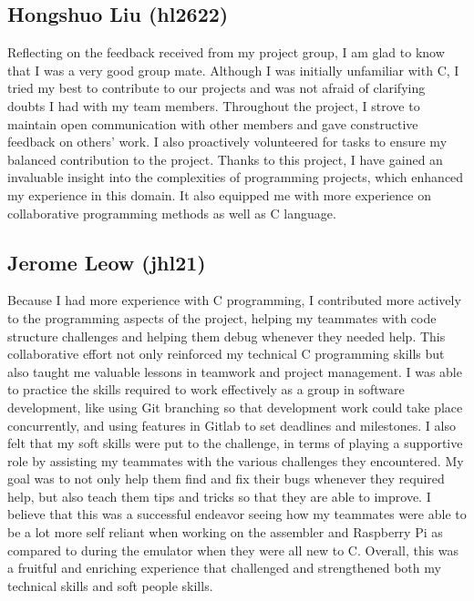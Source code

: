 \documentclass{article}
\begin{document}
        \begin{adjustwidth}{2em}{0pt}
        \subsection{Hongshuo Liu (hl2622)}
    
        Reflecting on the feedback received from my project group, I am glad to know that I was a very good group mate. Although I was initially unfamiliar with C, I tried my best to contribute to our projects and was not afraid of clarifying doubts I had with my team members. Throughout the project, I strove to maintain open communication with other members and gave constructive feedback on others' work. I also proactively volunteered for tasks to ensure my balanced contribution to the project. Thanks to this project, I have gained an invaluable insight into the complexities of programming projects, which enhanced my experience in this domain. It also equipped me with more experience on collaborative programming methods as well as C language.
        
        
        \subsection{Jerome Leow (jhl21)}
        
        Because I had more experience with C programming, I contributed more actively to the programming aspects of the project, helping my teammates with code structure challenges and helping them debug whenever they needed help. This collaborative effort not only reinforced my technical C programming skills but also taught me valuable lessons in teamwork and project management. I was able to practice the skills required to work effectively as a group in software development, like using Git branching so that development work could take place concurrently, and using features in Gitlab to set deadlines and milestones. I also felt that my soft skills were put to the challenge, in terms of playing a supportive role by assisting my teammates with the various challenges they encountered. My goal was to not only help them find and fix their bugs whenever they required help, but also teach them tips and tricks so that they are able to improve. I believe that this was a successful endeavor seeing how my teammates were able to be a lot more self reliant when working on the assembler and Raspberry Pi as compared to during the emulator when they were all new to C. Overall, this was a fruitful and enriching experience that challenged and strengthened both my technical skills and soft people skills.
        

\end{adjustwidth}
\end{document}
